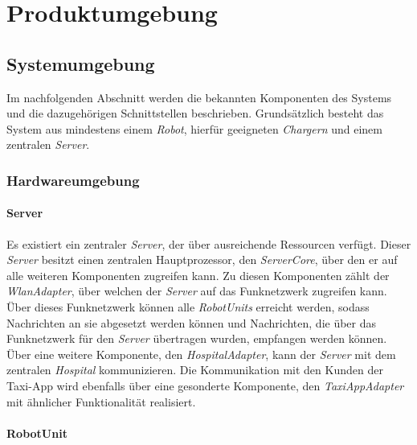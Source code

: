 \section{Produktumgebung}

  \subsection{Systemumgebung}
  Im nachfolgenden Abschnitt werden die bekannten Komponenten des Systems
  und die dazugehörigen Schnittstellen beschrieben.
  Grundsätzlich besteht
  das System aus mindestens einem \emph{Robot}, hierfür geeigneten
  \emph{Chargern} und einem zentralen \emph{Server}.

  \subsubsection{Hardwareumgebung}

  \paragraph{Server}\label{server}

  Es existiert ein zentraler \emph{Server}, der über ausreichende Ressourcen verfügt.
  Dieser \emph{Server} besitzt einen zentralen Hauptprozessor, den \emph{ServerCore}, über den er auf alle weiteren Komponenten zugreifen kann.
  Zu diesen Komponenten zählt der \emph{WlanAdapter}, über welchen der \emph{Server} auf das Funknetzwerk zugreifen kann.
  Über dieses Funknetzwerk können alle \emph{RobotUnits} erreicht werden, sodass Nachrichten an sie abgesetzt werden können und Nachrichten, die über das Funknetzwerk für den \emph{Server} übertragen wurden, empfangen werden können.
  Über eine weitere Komponente, den \emph{HospitalAdapter}, kann der \emph{Server} mit dem zentralen \emph{Hospital} kommunizieren.
  Die Kommunikation mit den Kunden der Taxi-App wird ebenfalls über eine gesonderte Komponente, den \emph{TaxiAppAdapter} mit ähnlicher Funktionalität realisiert.

  \paragraph{RobotUnit}\label{robotunit}

